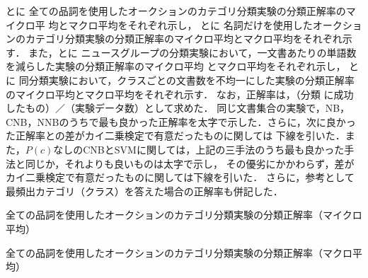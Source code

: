 \documentclass[japanese]{jnlp_1.4}
\newcommand{\tabref}[1]{}
\begin{document}
\tabref{Tab:全ての品詞を使用したオークションのカテゴリ分類実験の分類正解率}と\tabref{Tab:全ての品詞を使用したオークションのカテゴリ分類実験の分類正解率（マクロ）}に
全ての品詞を使用したオークションのカテゴリ分類実験の分類正解率のマイクロ平
均とマクロ平均をそれぞれ示し，
\tabref{Tab:名詞だけを使用したオークションのカテゴリ分類実験の分類正解率}と\tabref{Tab:名詞だけを使用したオークションのカテゴリ分類実験の分類正解率（マクロ）}に
名詞だけを使用したオークションのカテゴリ分類実験の分類正解率のマイクロ平均とマクロ平均をそれぞれ示す．
また，\tabref{Tab:一文書あたりの単語数を減らした実験の分類正解率}と\tabref{Tab:一文書あたりの単語数を減らした実験の分類正解率（マクロ）}に
ニュースグループの分類実験において，一文書あたりの単語数を減らした実験の分類正解率のマイクロ平均
とマクロ平均をそれぞれ示し，
\tabref{Tab:クラスごとの文書数を不均一にした実験の分類正解率}と\tabref{Tab:クラスごとの文書数を不均一にした実験の分類正解率（マクロ）}に
同分類実験において，クラスごとの文書数を不均一にした実験の分類正解率のマイクロ平均とマクロ平均をそれぞれ示す．
なお，正解率は，（分類
に成功したもの）／（実験データ数）として求めた．
同じ文書集合の実験で，NB，CNB，NNBのうちで最も良かった正解率を太字で示した．さらに，次に良かった正解率との差がカイ二乗検定で有意だったものに関しては
下線を引いた．また，$P(c)$なしのCNBとSVMに関しては，上記の三手法のうち最も良かった手法と同じか，それよりも良いものは太字で示し，
その優劣にかかわらず，差がカイ二乗検定で有意だったものに関しては下線を引いた．
さらに，参考として最頻出カテゴリ（クラス）を答えた場合の正解率も併記した．

\begin{table}[b]
\caption{全ての品詞を使用したオークションのカテゴリ分類実験の分類正解率（マイクロ平均）}
\label{Tab:全ての品詞を使用したオークションのカテゴリ分類実験の分類正解率}

\end{table}
\begin{table}[b]
\caption{全ての品詞を使用したオークションのカテゴリ分類実験の分類正解率（マクロ平均）}
\label{Tab:全ての品詞を使用したオークションのカテゴリ分類実験の分類正解率（マクロ）}

\end{table}
\end{document}
